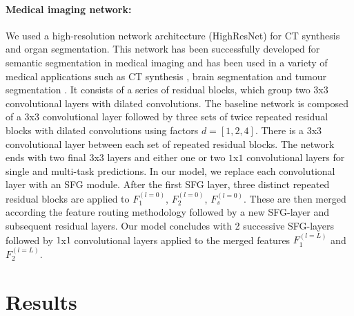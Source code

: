    \paragraph{Medical imaging network:} We used a high-resolution network architecture (HighResNet) \cite{wenqi} for CT synthesis and organ segmentation. This network has been successfully developed for semantic segmentation in medical imaging and has been used in a variety of medical applications such as CT synthesis \cite{bragman2018multi, kerstin}, brain segmentation \cite{wenqi} and tumour segmentation \cite{zach}. It consists of a series of residual blocks, which group two $3$x$3$ convolutional layers with dilated convolutions. The baseline network is composed of a $3$x$3$ convolutional layer followed by three sets of twice repeated residual blocks with dilated convolutions using factors $d=[1, 2, 4]$. There is a $3$x$3$ convolutional layer between each set of repeated residual blocks. The network ends with two final $3$x$3$ layers and either one or two $1$x$1$ convolutional layers for single and multi-task predictions. In our model, we replace each convolutional layer with an SFG module. After the first SFG layer, three distinct repeated residual blocks are applied to $F^{(l=0)}_{1}$, $F^{(l=0)}_{2}$, $F^{(l=0)}_{s}$. These are then merged according the feature routing methodology followed by a new SFG-layer and subsequent residual layers. Our model concludes with 2 successive SFG-layers followed by $1$x$1$ convolutional layers applied to the merged features $F^{(l=L)}_{1}$ and $F^{(l=L)}_{2}$. 





\section{Results}

